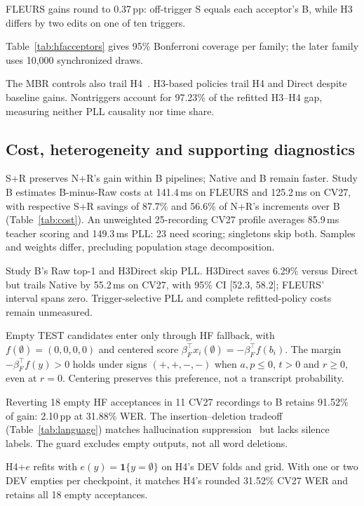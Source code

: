 FLEURS gains round to 0.37\,pp: off-trigger S equals each acceptor's B, while H3 differs by two edits on one of ten triggers.

\begin{samepage}
Table~\ref{tab:hfacceptors} gives 95\% Bonferroni coverage per family; the later family uses 10,000 synchronized draws.\par
\end{samepage}

The MBR controls also trail H4~\cite{jinnai2025mbrasr}. H3-based policies trail H4 and Direct despite baseline gains. Nontriggers account for 97.23\% of the refitted H3--H4 gap, measuring neither PLL causality nor time share.

\subsection{Cost, heterogeneity and supporting diagnostics}

S+R preserves N+R's gain within B pipelines; Native and B remain faster. Study B estimates B-minus-Raw costs at 141.4\,ms on FLEURS and 125.2\,ms on CV27, with respective S+R savings of 87.7\% and 56.6\% of N+R's increments over B (Table~\ref{tab:cost}). An unweighted 25-recording CV27 profile averages 85.9\,ms teacher scoring and 149.3\,ms PLL: 23 need scoring; singletons skip both. Samples and weights differ, precluding population stage decomposition.

Study B's Raw top-1 and H3Direct skip PLL. H3Direct saves 6.29\% versus Direct but trails Native by 55.2\,ms on CV27, with 95\% CI [52.3, 58.2]; FLEURS' interval spans zero. Trigger-selective PLL and complete refitted-policy costs remain unmeasured.


Empty TEST candidates enter only through HF fallback, with $f(\emptyset)=(0,0,0,0)$ and centered score $\beta_F^\top x_i(\emptyset)=-\beta_F^\top f(b_i)$. The margin $-\beta_F^\top f(y)>0$ holds under signs $(+,+,-,-)$ when $a,p\le0$, $t>0$ and $r\ge0$, even at $r=0$. Centering preserves this preference, not a transcript probability.

Reverting 18 empty HF acceptances in 11 CV27 recordings to B retains 91.52\% of gain: 2.10\,pp at 31.88\% WER. The insertion--deletion tradeoff (Table~\ref{tab:language}) matches hallucination suppression~\cite{baranski2025nonspeech} but lacks silence labels. The guard excludes empty outputs, not all word deletions.

\begin{samepage}
H4+$e$ refits with $e(y)=\mathbf1\{y=\emptyset\}$ on H4's DEV folds and grid. With one or two DEV empties per checkpoint, it matches H4's rounded 31.52\% CV27 WER and retains all 18 empty acceptances.\par
\end{samepage}

